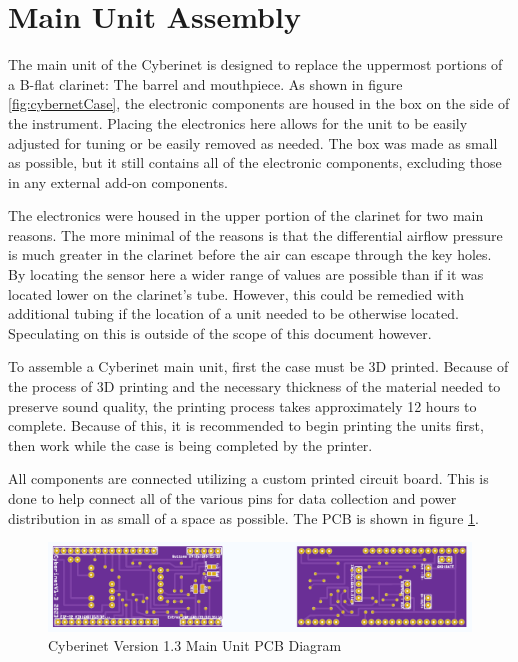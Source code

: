 \section{Main Unit Assembly}

The main unit of the Cyberinet is designed to replace the uppermost portions of a B-flat clarinet: The barrel and mouthpiece. As shown in figure \ref{fig:cybernetCase}, the electronic components are housed in the box on the side of the instrument. Placing the electronics here allows for the unit to be easily adjusted for tuning or be easily removed as needed. The box was made as small as possible, but it still contains all of the electronic components, excluding those in any external add-on components. 

The electronics were housed in the upper portion of the clarinet for two main reasons. The more minimal of the reasons is that the differential airflow pressure is much greater in the clarinet before the air can escape through the key holes. By locating the sensor here a wider range of values are possible than if it was located lower on the clarinet's tube. However, this could be remedied with additional tubing if the location of a unit needed to be otherwise located. Speculating on this is outside of the scope of this document however.

To assemble a Cyberinet main unit, first the case must be 3D printed. Because of the process of 3D printing and the necessary thickness of the material needed to preserve sound quality, the printing process takes approximately 12 hours to complete. Because of this, it is recommended to begin printing the units first, then work while the case is being completed by the printer.

All components are connected utilizing a custom printed circuit board. This is done to help connect all of the various pins for data collection and power distribution in as small of a space as possible. The PCB is shown in figure \ref{fig:mainUnitPCB}.

\begin{center}
    \begin{figure}
        \centering
        \includegraphics[scale=0.6]{diagrams/PCBs/cyberinetPCB.png}
        \caption{Cyberinet Version 1.3  Main Unit PCB Diagram}
        \label{fig:mainUnitPCB}
    \end{figure}
\end{center}

